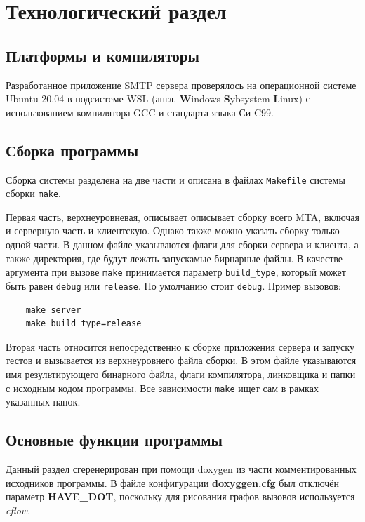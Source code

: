 \documentclass[a4paper,12pt]{report}
\begin{document}
\chapter{Технологический раздел}


\section{Платформы и компиляторы}

Разработанное приложение SMTP сервера проверялось на операционной системе Ubuntu-20.04 в подсистеме WSL (англ. \textbf{W}indows \textbf{S}ybsystem \textbf{L}inux) с использованием компилятора GCC и стандарта языка Си C99.


\section{Сборка программы}

Сборка системы разделена на две части и описана в файлах \texttt{Makefile} системы сборки \texttt{make}.

Первая часть, верхнеуровневая, описывает описывает сборку всего MTA, включая и серверную часть и клиентскую. Однако также можно указать сборку только одной части. В данном файле указываются флаги для сборки сервера и клиента, а также директория, где будут лежать запускамые бирнарные файлы. В качестве аргумента при вызове \texttt{make} принимается параметр \texttt{build\_type}, который может быть равен \texttt{debug} или \texttt{release}. По умолчанию стоит \texttt{debug}. Пример вызовов:
\begin{verbatim}
    make server
    make build_type=release
\end{verbatim}

Вторая часть относится непосредственно к сборке приложения сервера и запуску тестов и вызывается из верхнеуровнего файла сборки. В этом файле указываются имя результирующего бинарного файла, флаги компилятора, линковщика и папки с исходным кодом программы. Все зависимости \texttt{make} ищет сам в рамках указанных папок.


\section{Основные функции программы}

Данный раздел сгеренерирован при помощи doxygen из части комментированных исходников программы. В файле конфигурации \textbf{doxyggen.cfg} был отключён параметр \textbf{HAVE\_DOT}, поскольку для рисования графов вызовов используется \textit{cflow}.
\end{document}
